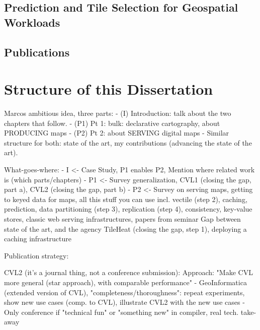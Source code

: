 \documentclass[11pt, oneside]{report}   	%
\begin{document}
\subsection{Prediction and Tile Selection for Geospatial Workloads}
\subsection{Publications}

\section{Structure of this Dissertation}







Marcos ambitious idea, three parts:
- (I) Introduction: talk about the two chapters that follow. 
- (P1) Pt 1: bulk: declarative cartography, about PRODUCING maps
- (P2) Pt 2: about SERVING digital maps
- Similar structure for both: state of the art, my contributions (advancing the state of the art).  

What-goes-where:
- I <- Case Study, P1 enables P2, Mention where related work is (which parts/chapters)
- P1 <- 
        Survey generalization, 
        CVL1 (closing the gap, part a), 
        CVL2 (closing the gap, part b)
- P2 <- 
        Survey on serving maps, getting to keyed data for maps, all this stuff you can use 
                incl. vectile (step 2),
                caching,
                prediction,
                data partitioning (step 3), 
                replication (step 4), 
                consistency, 
                key-value stores, 
                classic web serving infrastructures,
                papers from seminar
        Gap between state of the art, and the agency
        TileHeat (closing the gap, step 1), deploying a caching infrastructure
        
Publication strategy:

CVL2 (it's a journal thing, not a conference submission):
Approach: "Make CVL more general (star approach), with comparable performance"
- GeoInformatica (extended version of CVL), "completeness/thoroughness": repeat experiments, show new use cases (comp. to CVL), illustrate CVL2 with the new use cases 
- Only conference if "technical fun" or "something new" in compiler, real tech. take-away
\end{document}
